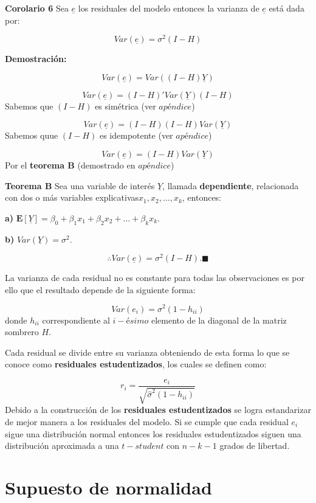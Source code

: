 \documentclass[
  a4paper,
  oneside,
  openany]{book}
\begin{document}
\textbf{Corolario 6} Sea \(\underline{e}\) los residuales del modelo entonces la varianza de \(\underline{e}\) está dada por:

\[Var(\underline{e})=\sigma^2(I-H)\]

\textbf{Demostración:}

\[Var(\underline{e})=Var((I-H)\underline{Y})\]

\[Var(\underline{e})=(I-H)'Var(\underline{Y})(I-H)\]
Sabemos que \((I-H)\) es simétrica (ver \(apéndice\))

\[Var(\underline{e})=(I-H)(I-H)Var(\underline{Y})\]
Sabemos quue \((I-H)\) es idempotente (ver \(apéndice\))

\[Var(\underline{e})=(I-H)Var(\underline{Y})\]
Por el \textbf{teorema B} (demostrado en \(apéndice\))

\textbf{Teorema B} Sea una variable de interés \(\underline{Y}\), llamada \textbf{dependiente}, relacionada con dos o más variables explicativas\(x_{1},x_{2},\ldots,x_{k}\),
entonces:

\textbf{a)} \(\mathbf{E}[\underline{Y}]= \beta_{0}+\beta_{1}x_{1}+\beta_{2}x_{2}+ \ldots + \beta_{k}x_{k}.\)

\textbf{b)} \(Var(\underline{Y})= \sigma^2.\)

\[\therefore Var(\underline{e})=\sigma^2(I-H). \blacksquare\]

La varianza de cada residual no es constante para todas las observaciones es por ello que el resultado depende de la siguiente forma:

\[Var(e_{i})=\sigma^2(1-h_{ii})\]
donde \(h_{ii}\) correspondiente al \(i-ésimo\) elemento de la diagonal de la matriz sombrero \(H\).

Cada residual se divide entre su varianza obteniendo de esta forma lo que se conoce como \textbf{residuales estudentizados}, los cuales se definen como:

\[r_{i}=\frac{e_{i}}{\sqrt{\hat{\sigma}^2(1-h_{ii})}}\]
Debido a la construcción de los \textbf{residuales estudentizados} se logra estandarizar de mejor manera a los residuales del modelo. Si se cumple que cada residual \(e_{i}\) sigue una distribución normal entonces los residuales estudentizados siguen una distribución aproximada a una \(t-student\) con \(n-k-1\) grados de libertad.

\hypertarget{supuesto-de-normalidad}{%
\section{Supuesto de normalidad}\label{supuesto-de-normalidad}}
\end{document}
